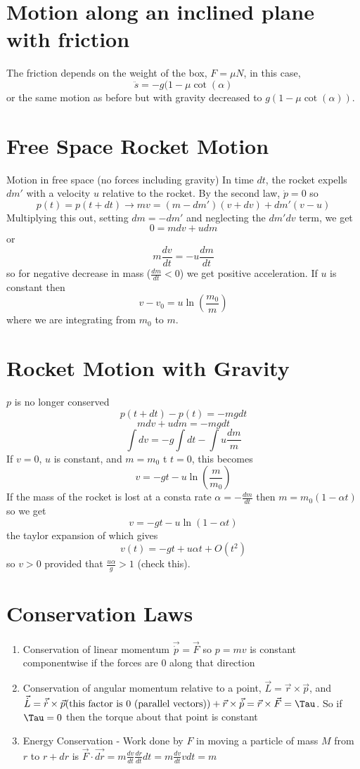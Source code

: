 \documentclass{homework}
\begin{document}
\section{Motion along an inclined plane with friction}

The friction depends on the weight of the box, $F = \mu N$, in this case,
\[\ddot s = -g(1 - \mu \cot (\alpha)\]
or the same motion as before but with gravity decreased to $g(1 - \mu \cot (\alpha))$.



\section{Free Space Rocket Motion}
Motion in free space (no forces including gravity)
In time $dt$, the rocket expells $dm'$ with a velocity $u$ relative to the rocket. By the second law, $\dot p = 0$ so 
\[p(t) = p(t + dt) \rightarrow mv = (m - dm')(v + dv) + dm'(v - u)\]
Multiplying this out, setting $dm = -dm'$ and neglecting the $dm'dv$ term, we get
\[0 = mdv + udm\]
or
\[m\frac{dv}{dt} = -u\frac{dm}{dt}\]
so for negative decrease in mass ($\frac{dm}{dt} <0$) we get positive acceleration. If $u$ is constant then 
\[v - v_0 = u\ln \left( \frac{m_0}{m} \right)\]
where we are integrating from $m_0$ to $m$. 

\section{Rocket Motion with Gravity}
$p$ is no longer conserved
\[p(t + dt) - p(t) = -mgdt\]
\[mdv + udm = -mgdt\]
\[\int dv = -g\int dt - \int u \frac{dm}{m}\]
If $v = 0$, $u$ is constant, and $m = m_0$ t $t = 0$, this becomes 
\[v = -gt -u\ln \left(\frac{m}{m_0} \right) \]
If the mass of the rocket is lost at a consta rate $\alpha = - \frac{dm}{dt}$ then $m = m_0(1 - \alpha t)$ so we get
\[v = -gt -u\ln(1 - \alpha t) \]
the taylor expansion of which gives
\[v(t) = -gt + u\alpha t + O(t^2)\]
so $v > 0$ provided that $\frac{u\alpha}{g} > 1$ (check this).

\section{Conservation Laws}

\begin{enumerate}
    \item {Conservation of linear momentum $\vec{\dot{p}} = \vec{F}$ so $p = mv$ is constant componentwise if the forces are $0$ along that direction}
    \item {Conservation of angular momentum relative to a point, $\vec{L} = \vec{r} \times \vec{p}$, and $\vec{\dot{L}} = \vec{\dot {r}} \times \vec{p} \text{(this factor is $0$ (parallel vectors))} + \vec{r} \times \vec{\dot {p}} = \vec{r} \times \vec{F} = \Tau$. So if $\Tau = 0$ then the torque about that point is constant}
    \item {Energy Conservation - Work done by $F$ in moving a particle of mass $M$ from $r$ to $r + dr$ is $\vec{F} \cdot \vec{dr} = m\frac{dv}{dt}\frac{dr}{dt} dt = m\frac{dv}{dt}vdt = m$}
    
\end{enumerate}
\end{document}

